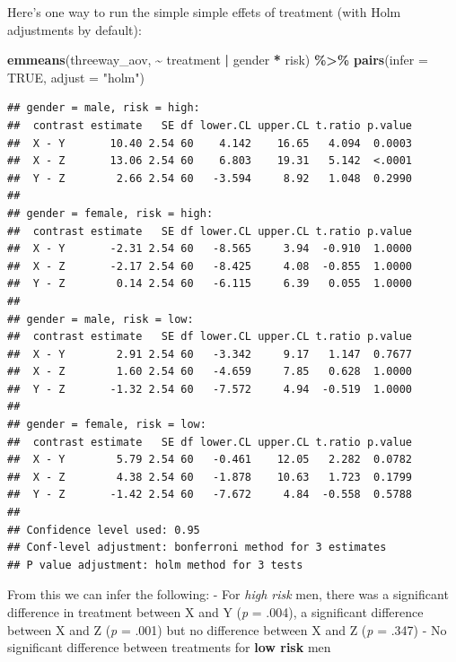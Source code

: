 \documentclass[
]{book}
\newenvironment{Shaded}{\begin{snugshade}}{\end{snugshade}}
\newcommand{\AttributeTok}[1]{\textcolor[rgb]{0.13,0.29,0.53}{#1}}
\newcommand{\ConstantTok}[1]{\textcolor[rgb]{0.56,0.35,0.01}{#1}}
\newcommand{\FunctionTok}[1]{\textcolor[rgb]{0.13,0.29,0.53}{\textbf{#1}}}
\newcommand{\NormalTok}[1]{#1}
\newcommand{\SpecialCharTok}[1]{\textcolor[rgb]{0.81,0.36,0.00}{\textbf{#1}}}
\newcommand{\StringTok}[1]{\textcolor[rgb]{0.31,0.60,0.02}{#1}}
\begin{document}
Here's one way to run the simple simple effets of treatment (with Holm adjustments by default):

\begin{Shaded}
\begin{Highlighting}[]
\FunctionTok{emmeans}\NormalTok{(threeway\_aov, }\SpecialCharTok{\textasciitilde{}}\NormalTok{ treatment }\SpecialCharTok{|}\NormalTok{ gender }\SpecialCharTok{*}\NormalTok{ risk) }\SpecialCharTok{\%\textgreater{}\%}
  \FunctionTok{pairs}\NormalTok{(}\AttributeTok{infer =} \ConstantTok{TRUE}\NormalTok{, }\AttributeTok{adjust =} \StringTok{"holm"}\NormalTok{)}
\end{Highlighting}
\end{Shaded}

\begin{verbatim}
## gender = male, risk = high:
##  contrast estimate   SE df lower.CL upper.CL t.ratio p.value
##  X - Y       10.40 2.54 60    4.142    16.65   4.094  0.0003
##  X - Z       13.06 2.54 60    6.803    19.31   5.142  <.0001
##  Y - Z        2.66 2.54 60   -3.594     8.92   1.048  0.2990
## 
## gender = female, risk = high:
##  contrast estimate   SE df lower.CL upper.CL t.ratio p.value
##  X - Y       -2.31 2.54 60   -8.565     3.94  -0.910  1.0000
##  X - Z       -2.17 2.54 60   -8.425     4.08  -0.855  1.0000
##  Y - Z        0.14 2.54 60   -6.115     6.39   0.055  1.0000
## 
## gender = male, risk = low:
##  contrast estimate   SE df lower.CL upper.CL t.ratio p.value
##  X - Y        2.91 2.54 60   -3.342     9.17   1.147  0.7677
##  X - Z        1.60 2.54 60   -4.659     7.85   0.628  1.0000
##  Y - Z       -1.32 2.54 60   -7.572     4.94  -0.519  1.0000
## 
## gender = female, risk = low:
##  contrast estimate   SE df lower.CL upper.CL t.ratio p.value
##  X - Y        5.79 2.54 60   -0.461    12.05   2.282  0.0782
##  X - Z        4.38 2.54 60   -1.878    10.63   1.723  0.1799
##  Y - Z       -1.42 2.54 60   -7.672     4.84  -0.558  0.5788
## 
## Confidence level used: 0.95 
## Conf-level adjustment: bonferroni method for 3 estimates 
## P value adjustment: holm method for 3 tests
\end{verbatim}

From this we can infer the following:
- For \emph{high risk} men, there was a significant difference in treatment between X and Y (\emph{p} = .004), a significant difference between X and Z (\emph{p} = .001) but no difference between X and Z (\emph{p} = .347)
- No significant difference between treatments for \textbf{low risk} men
\end{document}
